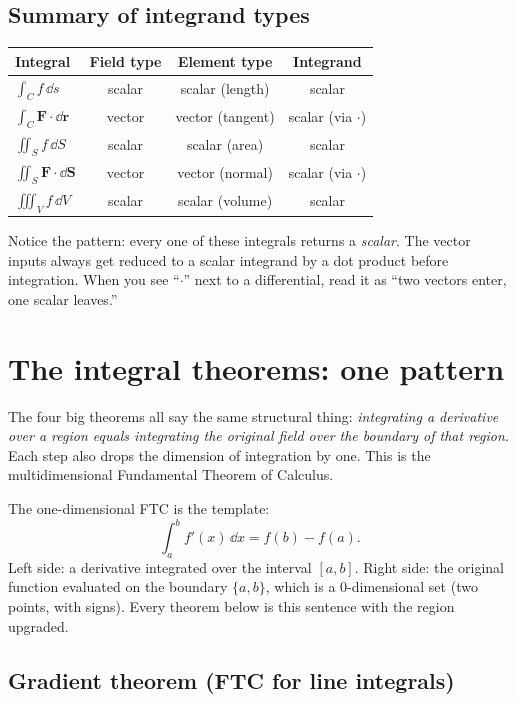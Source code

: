\documentclass{essay}
\newcommand{\F}{\mathbf{F}}
\begin{document}
\subsection{Summary of integrand types}

\begin{center}
  \renewcommand{\arraystretch}{1.4}
  \begin{tabular}{@{}l c c c@{}}
    \toprule
    \textbf{Integral} & \textbf{Field type} & \textbf{Element type} & \textbf{Integrand} \\
    \midrule
    $\int_C f\,\dd s$            & scalar & scalar (length) & scalar \\
    $\int_C \F\cdot\dd\mathbf{r}$ & vector & vector (tangent) & scalar (via $\cdot$) \\
    $\iint_S f\,\dd S$           & scalar & scalar (area)   & scalar \\
    $\iint_S \F\cdot\dd\mathbf{S}$ & vector & vector (normal) & scalar (via $\cdot$) \\
    $\iiint_V f\,\dd V$          & scalar & scalar (volume) & scalar \\
    \bottomrule
  \end{tabular}
\end{center}

Notice the pattern: every one of these integrals returns a \emph{scalar}. The vector
inputs always get reduced to a scalar integrand by a dot product before integration.
When you see ``$\cdot$'' next to a differential, read it as ``two vectors enter, one
scalar leaves.''

\section{The integral theorems: one pattern}

The four big theorems all say the same structural thing: \emph{integrating a
  derivative over a region equals integrating the original field over the boundary of
that region.} Each step also drops the dimension of integration by one. This is the
multidimensional Fundamental Theorem of Calculus.

The one-dimensional FTC is the template:
\[
  \int_a^b f'(x)\,\dd x = f(b) - f(a).
\]
Left side: a derivative integrated over the interval $[a,b]$. Right side: the
original function evaluated on the boundary $\{a,b\}$, which is a $0$-dimensional set
(two points, with signs). Every theorem below is this sentence with the region
upgraded.

\subsection{Gradient theorem (FTC for line integrals)}
\end{document}
